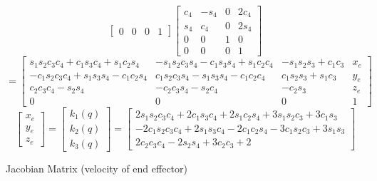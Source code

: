 \documentclass{article}
\begin{document}
{\[\begin{bmatrix}
0 & 0 & 0 & 1
\end{bmatrix}
\begin{bmatrix}
c_{4} & - s_{4} & 0 & 2c_{4} \\
s_{4} & c_{4} & 0 & 2s_{4} \\
0 & 0 & 1 & 0 \\
0 & 0 & 0 & 1
\end{bmatrix}
\]
\[
=
\begin{bmatrix}
s_{1}s_{2}c_{3}c_{4} + c_{1}s_{3}c_{4} + s_{1}c_{2}s_{4} &
-s_{1}s_{2}c_{3}s_{4} -c_{1}s_{3}s_{4} + s_{1}c_{2}c_{4} &
-s_{1}s_{2}s_{3} + c_{1}c_{3} &
x_{e} \\
-c_{1}s_{2}c_{3}c_{4} + s_{1}s_{3}s_{4} - c_{1}c_{2}s_{4} &
c_{1}s_{2}c_{3}s_{4} -s_{1}s_{3}s_{4} - c_{1}c_{2}c_{4} &
c_{1}s_{2}s_{3} + s_{1}c_{3} &
y_{e} \\
c_{2}c_{3}c_{4} -s_{2}s_{4} &
-c_{2}c_{3}s_{4} -s_{2}c_{4} &
-c_{2}s_{3}
& z_{e} \\
0 & 
0 & 
0 & 
1
\end{bmatrix}
\]
\[
\begin{bmatrix}
x_{e} \\
y_{e} \\
z_{e}
\end{bmatrix}
=
\begin{bmatrix}
k_{1}(q) \\
k_{2}(q) \\
k_{3}(q)
\end{bmatrix}
=
\begin{bmatrix}
2s_{1}s_{2}c_{3}c_{4} + 2c_{1}s_{3}c_{4} + 2s_{1}c_{2}s_{4} +3s_{1}s_{2}c_{3} + 3c_{1}s_{3} \\
-2c_{1}s_{2}c_{3}c_{4} + 2s_{1}s_{3}c_{4} - 2c_{1}c_{2}s_{4} -3c_{1}s_{2}c_{3} + 3s_{1}s_{3} \\
2c_{2}c_{3}c_{4} -2s_{2}s_{4} + 3c_{2}c_{3}+2
\end{bmatrix}
\]
}
\newpage

\begin{center}
	{\Large Jacobian Matrix (velocity of end effector)}
\end{center}
\end{document}

